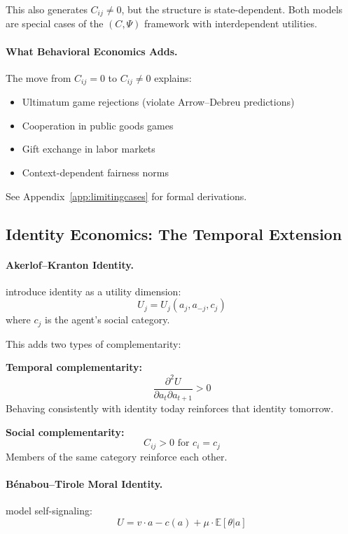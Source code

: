 \documentclass[12pt,a4paper]{article}
\begin{document}
This also generates $C_{ij} \neq 0$, but the structure is state-dependent.
Both models are special cases of the $(C, \Psi)$ framework with interdependent utilities.

\paragraph{What Behavioral Economics Adds.}
The move from $C_{ij} = 0$ to $C_{ij} \neq 0$ explains:
\begin{itemize}
  \item Ultimatum game rejections (violate Arrow--Debreu predictions)
  \item Cooperation in public goods games
  \item Gift exchange in labor markets
  \item Context-dependent fairness norms
\end{itemize}

See Appendix~\ref{app:limitingcases} for formal derivations.

\subsection{Identity Economics: The Temporal Extension}

\paragraph{Akerlof--Kranton Identity.}
\citet{akerlofkranton} introduce identity as a utility dimension:
\begin{equation}
  U_j = U_j(a_j, a_{-j}, c_j)
\end{equation}
where $c_j$ is the agent's social category.

This adds two types of complementarity:

\textbf{Temporal complementarity:}
\begin{equation}
  \frac{\partial^2 U}{\partial a_t \partial a_{t+1}} > 0
\end{equation}
Behaving consistently with identity today reinforces that identity tomorrow.

\textbf{Social complementarity:}
\begin{equation}
  C_{ij} > 0 \text{ for } c_i = c_j
\end{equation}
Members of the same category reinforce each other.

\paragraph{Bénabou--Tirole Moral Identity.}
\citet{benaboutirole} model self-signaling:
\begin{equation}
  U = v \cdot a - c(a) + \mu \cdot \mathbb{E}[\theta | a]
\end{equation}
\end{document}
